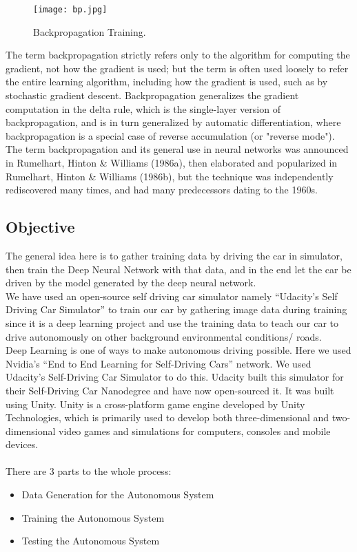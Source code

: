 \begin{figure}[H]
	\centering
	\texttt{[image: bp.jpg]}
	\caption{Backpropagation Training.}
\end{figure}

The term backpropagation strictly refers only to the algorithm for computing the gradient, not how the gradient is used; but the term is often used loosely to refer the entire learning algorithm, including how the gradient is used, such as by stochastic gradient descent. Backpropagation generalizes the gradient computation in the delta rule, which is the single-layer version of backpropagation, and is in turn generalized by automatic differentiation, where backpropagation is a special case of reverse accumulation (or "reverse mode"). The term backpropagation and its general use in neural networks was announced in Rumelhart, Hinton \& Williams (1986a), then elaborated and popularized in Rumelhart, Hinton \& Williams (1986b), but the technique was independently rediscovered many times, and had many predecessors dating to the 1960s.

\subsection{Objective}
The general idea here is to gather training data by driving the car in simulator, then train the Deep Neural Network with that data, and in the end let the car be driven by the model generated by the deep neural network.\\
We have used an open-source self driving car simulator namely “Udacity’s Self Driving Car Simulator” to train our car by gathering image data during training since it is a deep learning project and use the training data to teach our car to drive autonomously on other background environmental conditions/ roads.\\

Deep Learning is one of ways to make autonomous driving possible. Here we used Nvidia’s “End to End Learning for Self-Driving Cars” network. We used Udacity’s Self-Driving Car Simulator to do this. Udacity built this simulator for their Self-Driving Car Nanodegree and have now open-sourced it. It was built using Unity. Unity is a cross-platform game engine developed by Unity Technologies, which is primarily used to develop both three-dimensional and two-dimensional video games and simulations for computers, consoles and mobile devices.\\\\
There are 3 parts to the whole process:
\begin{itemize}
	\item Data Generation for the Autonomous System
	\item Training the Autonomous System
	\item Testing the Autonomous System
\end{itemize}

